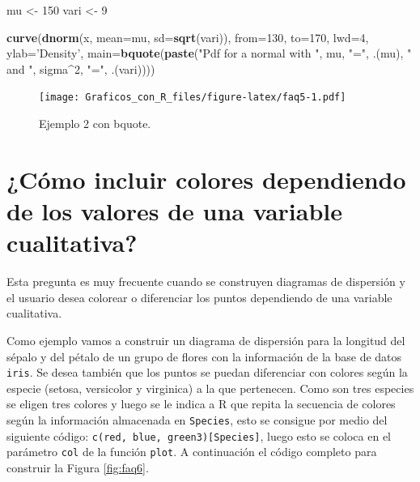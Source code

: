 \documentclass[10pt,]{krantz}
\makeatletter
\newenvironment{Shaded}{\begin{snugshade}}{\end{snugshade}}
\newcommand{\KeywordTok}[1]{\textcolor[rgb]{0.13,0.29,0.53}{\textbf{#1}}}
\newcommand{\DataTypeTok}[1]{\textcolor[rgb]{0.13,0.29,0.53}{#1}}
\newcommand{\DecValTok}[1]{\textcolor[rgb]{0.00,0.00,0.81}{#1}}
\newcommand{\StringTok}[1]{\textcolor[rgb]{0.31,0.60,0.02}{#1}}
\newcommand{\OperatorTok}[1]{\textcolor[rgb]{0.81,0.36,0.00}{\textbf{#1}}}
\newcommand{\NormalTok}[1]{#1}
\let\proglang=\textsf
\newenvironment{kframe}{%
\medskip{}
\setlength{\fboxsep}{.8em}
 \def\at@end@of@kframe{}%
 \ifinner\ifhmode%
  \def\at@end@of@kframe{\end{minipage}}%
  \begin{minipage}{\columnwidth}%
 \fi\fi%
 \def\FrameCommand##1{\hskip\@totalleftmargin \hskip-\fboxsep
 \colorbox{shadecolor}{##1}\hskip-\fboxsep
     \hskip-\linewidth \hskip-\@totalleftmargin \hskip\columnwidth}%
 \MakeFramed {\advance\hsize-\width
   \@totalleftmargin\z@ \linewidth\hsize
   \@setminipage}}%
 {\par\unskip\endMakeFramed%
 \at@end@of@kframe}
\renewenvironment{Shaded}{\begin{kframe}}{\end{kframe}}
\makeatother
\begin{document}
\begin{Shaded}
\begin{Highlighting}[]
\NormalTok{mu <-}\StringTok{ }\DecValTok{150}
\NormalTok{vari <-}\StringTok{ }\DecValTok{9}

\KeywordTok{curve}\NormalTok{(}\KeywordTok{dnorm}\NormalTok{(x, }\DataTypeTok{mean=}\NormalTok{mu, }\DataTypeTok{sd=}\KeywordTok{sqrt}\NormalTok{(vari)), }\DataTypeTok{from=}\DecValTok{130}\NormalTok{, }\DataTypeTok{to=}\DecValTok{170}\NormalTok{,}
      \DataTypeTok{lwd=}\DecValTok{4}\NormalTok{, }\DataTypeTok{ylab=}\StringTok{'Density'}\NormalTok{,}
      \DataTypeTok{main=}\KeywordTok{bquote}\NormalTok{(}\KeywordTok{paste}\NormalTok{(}\StringTok{"Pdf for a normal with "}\NormalTok{,}
\NormalTok{                  mu, }\StringTok{"="}\NormalTok{, .(mu),}
                  \StringTok{" and "}\NormalTok{,}
\NormalTok{                  sigma}\OperatorTok{^}\DecValTok{2}\NormalTok{, }\StringTok{"="}\NormalTok{, .(vari))))}
\end{Highlighting}
\end{Shaded}

\begin{figure}
\centering
\texttt{[image: Graficos\_con\_R\_files/figure-latex/faq5-1.pdf]}
\caption{\label{fig:faq5}Ejemplo 2 con bquote.}
\end{figure}

\section{¿Cómo incluir colores dependiendo de los valores de una
variable
cualitativa?}\label{como-incluir-colores-dependiendo-de-los-valores-de-una-variable-cualitativa}

Esta pregunta es muy frecuente cuando se construyen diagramas de
dispersión y el usuario desea colorear o diferenciar los puntos
dependiendo de una variable cualitativa.

Como ejemplo vamos a construir un diagrama de dispersión para la
longitud del sépalo y del pétalo de un grupo de flores con la
información de la base de datos \texttt{iris}. Se desea también que los
puntos se puedan diferenciar con colores según la especie (setosa,
versicolor y virginica) a la que pertenecen. Como son tres especies se
eligen tres colores y luego se le indica a \proglang{R} que repita la
secuencia de colores según la información almacenada en
\texttt{Species}, esto se consigue por medio del siguiente código:
\texttt{c(\textquotesingle{}red\textquotesingle{},\ \textquotesingle{}blue\textquotesingle{},\ \textquotesingle{}green3\textquotesingle{}){[}Species{]}},
luego esto se coloca en el parámetro \texttt{col} de la función
\texttt{plot}. A continuación el código completo para construir la
Figura \ref{fig:faq6}.
\end{document}
